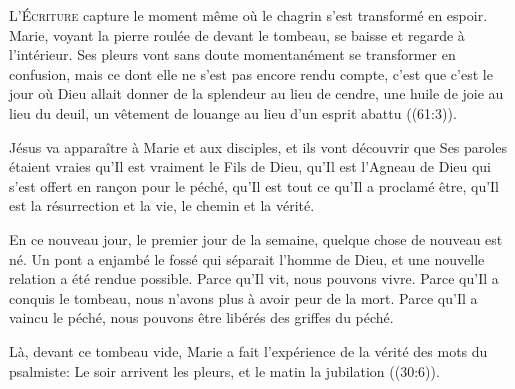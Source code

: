 \dvrule







\lettrine{L}{'Écriture} capture le moment même où le chagrin
 s'est transformé en espoir. Marie, voyant la pierre roulée
 de devant le tombeau, se baisse et regarde à l'intérieur.
 Ses pleurs vont sans doute momentanément se transformer en confusion,
 mais ce dont elle ne s'est pas encore rendu compte,
 c'est que c'est le jour où Dieu allait donner \Og de la splendeur
 au lieu de cendre, une huile de joie au lieu du deuil,
 un vêtement de louange au lieu d'un esprit abattu \Fg{}
 ((61:3)).


Jésus va apparaître à Marie et aux disciples, et ils vont découvrir
 que Ses paroles étaient vraies \ocadr qu'Il est vraiment le Fils de Dieu,
 qu'Il est l'Agneau de Dieu qui s'est offert en ran\c{c}on pour le péché,
 qu'Il est tout ce qu'Il a proclamé être, qu'Il est la résurrection et la vie,
 le chemin et la vérité.

En ce nouveau jour, le premier jour de la semaine,
 quelque chose de nouveau est né. Un pont a enjambé le fossé
 qui séparait l'homme de Dieu, et une nouvelle relation a été rendue possible.
 Parce qu'Il vit, nous pouvons vivre. Parce qu'Il a conquis le tombeau,
 nous n'avons plus à avoir peur de la mort. Parce qu'Il a vaincu le péché,
 nous pouvons être libérés des griffes du péché.

Là, devant ce tombeau vide, Marie a fait l'expérience de la vérité
 des mots du psalmiste:
 \Og Le soir arrivent les pleurs, et le matin la jubilation \Fg{}
 ((30:6)).

\dvrule



